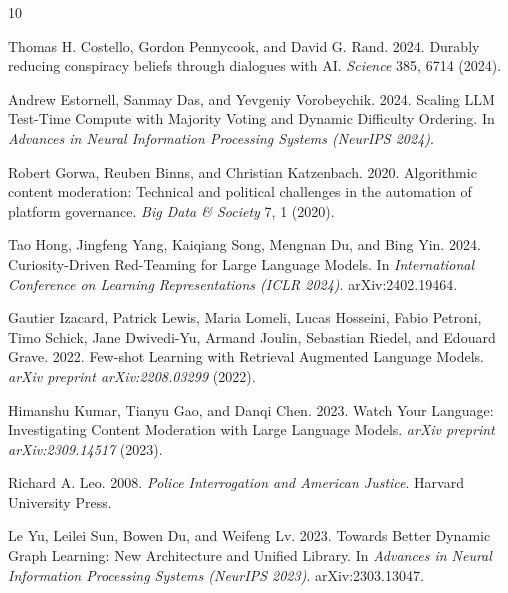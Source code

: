 \documentclass[sigconf]{acmart}
\begin{document}

\begin{thebibliography}{10}

Thomas H. Costello, Gordon Pennycook, and David G. Rand. 2024.
\newblock Durably reducing conspiracy beliefs through dialogues with AI.
\newblock \emph{Science} 385, 6714 (2024).

Andrew Estornell, Sanmay Das, and Yevgeniy Vorobeychik. 2024.
\newblock Scaling LLM Test-Time Compute with Majority Voting and Dynamic
  Difficulty Ordering.
\newblock In \emph{Advances in Neural Information Processing Systems (NeurIPS
  2024)}.

Robert Gorwa, Reuben Binns, and Christian Katzenbach. 2020.
\newblock Algorithmic content moderation: Technical and political challenges in
  the automation of platform governance.
\newblock \emph{Big Data \& Society} 7, 1 (2020).

Tao Hong, Jingfeng Yang, Kaiqiang Song, Mengnan Du, and Bing Yin. 2024.
\newblock Curiosity-Driven Red-Teaming for Large Language Models.
\newblock In \emph{International Conference on Learning Representations (ICLR
  2024)}. arXiv:2402.19464.

Gautier Izacard, Patrick Lewis, Maria Lomeli, Lucas Hosseini, Fabio Petroni,
  Timo Schick, Jane Dwivedi-Yu, Armand Joulin, Sebastian Riedel, and Edouard
  Grave. 2022.
\newblock Few-shot Learning with Retrieval Augmented Language Models.
\newblock \emph{arXiv preprint arXiv:2208.03299} (2022).

Himanshu Kumar, Tianyu Gao, and Danqi Chen. 2023.
\newblock Watch Your Language: Investigating Content Moderation with Large
  Language Models.
\newblock \emph{arXiv preprint arXiv:2309.14517} (2023).

Richard A. Leo. 2008.
\newblock \emph{Police Interrogation and American Justice}.
\newblock Harvard University Press.

Le Yu, Leilei Sun, Bowen Du, and Weifeng Lv. 2023.
\newblock Towards Better Dynamic Graph Learning: New Architecture and Unified
  Library.
\newblock In \emph{Advances in Neural Information Processing Systems (NeurIPS
  2023)}. arXiv:2303.13047.

\end{thebibliography}
\end{document}
